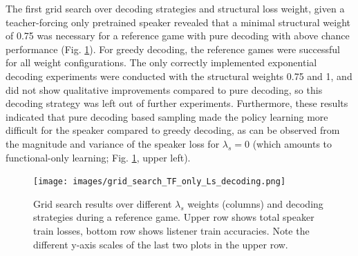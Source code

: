 The first grid search over decoding strategies and structural loss weight, given a teacher-forcing only pretrained speaker revealed that a minimal structural weight of 0.75 was necessary for a reference game with pure decoding with above chance performance (Fig. \ref{fig:coco_grid_Ls_decoding_TF_only}). For greedy decoding, the reference games were successful for all weight configurations. The only correctly implemented exponential decoding experiments were conducted with the structural weights 0.75 and 1, and did not show qualitative improvements compared to pure decoding, so this decoding strategy was left out of further experiments. Furthermore, these results indicated that pure decoding based sampling made the policy learning more difficult for the speaker compared to greedy decoding, as can be observed from the magnitude and variance of the speaker loss for $\lambda_s = 0$ (which amounts to functional-only learning; Fig. \ref{fig:coco_grid_Ls_decoding_TF_only}, upper left).

\begin{figure}
	\centering
	\texttt{[image: images/grid\_search\_TF\_only\_Ls\_decoding.png]}
	\caption{Grid search results over different $\lambda_s$ weights (columns) and decoding strategies during a reference game. Upper row shows total speaker train losses, bottom row shows listener train accuracies. Note the different y-axis scales of the last two plots in the upper row.}
	\label{fig:coco_grid_Ls_decoding_TF_only}
\end{figure}

